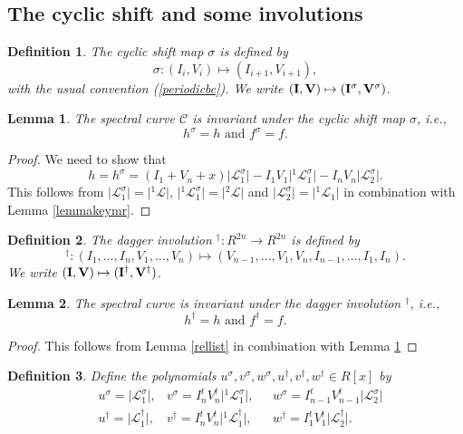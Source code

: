 \documentclass[11pt, a4paper]{amsart}
\newcommand{\eqst}[1]{\begin{equation*}#1\end{equation*}}
\theoremstyle{plain}
\newtheorem{lemma}{Lemma}[section]
\newtheorem{definition}{Definition}[section]
\numberwithin{equation}{section}
\begin{document}
\subsection{The cyclic shift and some involutions}

\begin{definition}
\label{cyclicshift}
The cyclic shift map $\sigma$ is defined by \eqst{\sigma: (I_i,V_i) \longmapsto (I_{i+1},V_{i+1}),} with the usual convention (\ref{periodicbc}). We write $(\bold I, \bold V) \mapsto (\bold I ^\sigma, \bold V ^\sigma)$.
\end{definition}
\begin{lemma}
\label{baslem}
The spectral curve $\mathcal C$ is invariant under the cyclic shift map $\sigma$, i.e.,  \eqst{h^\sigma = h \text{ and }f^\sigma = f.}
\end{lemma}
\begin{proof}
We need to show that \eqst{h = h^\sigma = (I_1+V_n+x)\vert \mathcal L^\sigma_1\vert-I_1V_1 \vert{}^1\mathcal L^\sigma_1\vert - I_nV_n \vert \mathcal L^\sigma_2\vert.}
This follows from $\vert \mathcal L^\sigma_1\vert = \vert {^1\mathcal L \vert}$, $\vert {}^1 \mathcal L^\sigma_1 \vert = \vert{}^2 \mathcal L \vert$ and $\vert \mathcal L^\sigma_2\vert = \vert {}^1 \mathcal L _1 \vert$ in combination with Lemma \ref{lemmakeymr}.
\end{proof}
\begin{definition}
\label{daggerinvolution}
The dagger involution ${}^\dagger :R^{2n}\longrightarrow R^{2n}$ is defined by \eqst{{}^\dagger : (I_1,\dots,I_n,V_1,\dots,V_n) \mapsto (V_{n-1},\dots,V_1,V_n,I_{n-1},\dots,I_1,I_n).}
We write $(\bold I,\bold V) \mapsto (\bold I ^\dagger,\bold V ^\dagger)$.
\end{definition}
\begin{lemma}
The spectral curve is invariant under the dagger involution ${}^\dagger$, i.e.,  \eqst{h^\dagger = h \text{ and }f^\dagger = f.}
\end{lemma}
\begin{proof}
This follows from Lemma \ref{rellist} in combination with Lemma \ref{baslem}
\end{proof}

\begin{definition}
\label{definitionuvwsd}
Define the polynomials $u^\sigma,v^\sigma,w^\sigma,u^\dagger,v^\dagger,w^\dagger \in R[x]$ by
\[
\begin{aligned}
&u^\sigma  = \vert \mathcal L^\sigma _1 \vert, 
&v^\sigma =  I^t_n V^t_n \vert {}^1\mathcal L^\sigma _1 \vert, \ \ \ 
&w^\sigma =  I^t_{n-1}V^t_{n-1} \vert \mathcal L^\sigma _ 2 \vert \\
&u^\dagger = \vert \mathcal L ^\dagger _1 \vert, 
&v^\dagger = I^t_n V^t_n \vert {}^1\mathcal L^\dagger _1 \vert , \ \ \ 
&w^\dagger =  I^t_{1}V^t_{1} \vert \mathcal L^\dagger _ 2 \vert .
\end{aligned}
\]
\end{definition}
\end{document}

